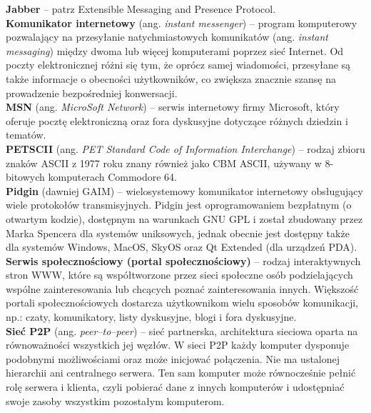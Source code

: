 \documentclass[a4paper,12pt]{article}
\begin{document}
\noindent\textbf{Jabber} -- patrz Extensible Messaging and Presence Protocol.\\

\noindent\textbf{Komunikator internetowy} (ang. \textit{instant messenger}) -- program komputerowy pozwalający na przesyłanie natychmiastowych komunikatów (ang. \textit{instant messaging}) między dwoma lub więcej komputerami poprzez sieć Internet. Od poczty elektronicznej różni się tym, że oprócz samej wiadomości, przesyłane są także informacje o obecności użytkowników, co zwiększa znacznie szansę na prowadzenie bezpośredniej konwersacji.\\

\noindent\textbf{MSN} (ang. \textit{MicroSoft Network}) -- serwis internetowy firmy Microsoft, który oferuje pocztę elektroniczną oraz fora dyskusyjne dotyczące różnych dziedzin i tematów.\\

\noindent\textbf{PETSCII} (ang. \textit{PET Standard Code of Information Interchange}) -- rodzaj zbioru znaków ASCII z 1977 roku znany również jako CBM ASCII, używany w 8-bitowych komputerach Commodore 64.\\

\noindent\textbf{Pidgin} (dawniej GAIM) -- wielosystemowy komunikator internetowy obsługujący wiele protokołów transmisyjnych. Pidgin jest oprogramowaniem bezpłatnym (o otwartym kodzie), dostępnym na warunkach GNU GPL i został zbudowany przez Marka Spencera dla systemów uniksowych, jednak obecnie jest dostępny także dla systemów Windows, MacOS, SkyOS oraz Qt Extended (dla urządzeń PDA).\\

\noindent\textbf{Serwis społecznościowy (portal społecznościowy)} -- rodzaj interaktywnych stron WWW, które są współtworzone przez sieci społeczne osób podzielających wspólne zainteresowania lub chcących poznać zainteresowania innych. Większość portali społecznościowych dostarcza użytkownikom wielu sposobów komunikacji, np.: czaty, komunikatory, listy dyskusyjne, blogi i fora dyskusyjne.\\

\noindent\textbf{Sieć P2P} (ang. \textit{peer--to--peer}) -- sieć partnerska, architektura sieciowa oparta na równoważności wszystkich jej węzłów. W sieci P2P każdy komputer dysponuje podobnymi możliwościami oraz może inicjować połączenia. Nie ma ustalonej hierarchii ani centralnego serwera. Ten sam komputer może równocześnie pełnić rolę serwera i klienta, czyli pobierać dane z innych komputerów i udostępniać swoje zasoby wszystkim pozostałym komputerom.\\
\end{document}
